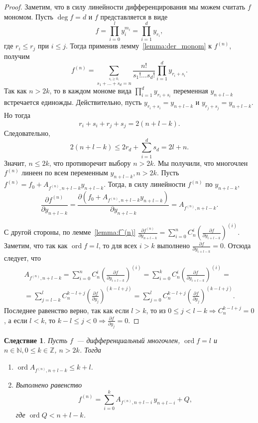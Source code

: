 \documentclass[16pt]{article}
\DeclareMathOperator{\ord}{ord}
\renewcommand{\le}{\leqslant} %
\renewcommand{\ge}{\geqslant} %
\theoremstyle{plain1}
\theoremstyle{plain2}
\theoremstyle{plain}
\theoremstyle{plain3}
\newtheorem{corollary}[theorem1]{Следствие}
\theoremstyle{definition}
\theoremstyle{remark}
\begin{document}
\begin{proof}
Заметим, что в силу линейности дифференцирования мы можем считать
$f$ мономом. Пусть $\deg f = d$ и $f$ представляется в
виде
$$
f=\prod\limits_{i=0}^ly_i^{m_i}=\prod\limits_{i=1}^{d}y_{r_i},
$$
где $r_i\le r_j$ при $i \le j$. Тогда применив лемму~\ref{lemma:der_monom} к $f^{(n)}$,
получим
$$
f^{(n)}=\sum\limits_{\stackrel{s_i\ge0,}{
s_1+\ldots+s_d=n}}\frac{n!}{s_1!\ldots s_d!}
\prod\limits_{i=1}^dy_{r_i+s_i}.
$$
Так как $n>2k$, то в каждом мономе вида $\prod_{i=1}^d y_{r_i+s_i}$
переменная $y_{n+l-k}$ встречается единожды. Действительно, пусть
$y_{r_i+s_i}=y_{n+l-k}$ и $y_{r_j+s_j}=y_{n+l-k}$. Но тогда
$$
r_i+s_i+r_j+s_j = 2(n+l-k).
$$
Следовательно,
$$
2(n+l-k)\le 2r_d + \sum_{i=1}^d s_d = 2l +n.
$$
Значит, $n \le 2k$, что противоречит выбору $n>2k$. Мы получили, что многочлен $f^{(n)}$ линеен по всем переменным $y_{n+l-k},n>2k $. Пусть $f^{(n)}=f_0+A_{f^{(n)},n+l-k}y_{n+l-k}$. Тогда, в силу линейности $f^{(n)}$ по $y_{n+l-k}$,
$$
\frac{\partial f^{(n)}}{\partial y_{n+l-k}}=\frac{\partial (f_0+A_{f^{(n)},n+l-k}y_{n+l-k})}{\partial y_{n+l-k}}=A_{f^{(n)},n+l-k}.
$$

С другой стороны, по лемме~\ref{lemma:f^(n)} $\frac{\partial f^{(n)}}{\partial y_{n+l-k}}= \sum\limits_{i=0}^n  C_n^i  \left(\frac{\partial f}{\partial y_{i+l-k}}\right)^{(i)} $. Заметим, что так как $\ord f = l$, то для всех $i>k$ выполнено $\frac{\partial f}{\partial y_{i+l-k}}=0$. Отсюда следует, что 
\begin{gather*}
A_{f^{(n)},n+l-k}=\sum\limits_{i=0}^n  C_n^i  \left(\frac{\partial f}{\partial y_{i+l-k}}\right)^{(i)}=\sum\limits_{i=0}^k  C_n^i  \left(\frac{\partial f}{\partial y_{i+l-k}}\right)^{(i)}=\\
=\sum\limits_{j=l-k}^l  C_n^{k-l+j}  \left(\frac{\partial f}{\partial y_{j}}\right)^{(k-l+j)}=\sum\limits_{j=0}^{l}C_n^{k - l + j
}\left(\frac{\partial f}{\partial y_j}\right)^{(k - l + j)}.
\end{gather*}
Последнее равенство верно, так как если $l>k$, то из $0 \le j<l-k \Longrightarrow C_n^{k-l+j}=0$, а если $l<k$, то  $k-l\le j<0 \Longrightarrow \frac{\partial f}{\partial y_{j}}=0$. 
\end{proof}

\begin{corollary}\label{corollary:deriv_equal}
Пусть $f$~--- дифференциальный многочлен, $\ord f = l$ и $n\in\mathbb{N},0\le k\in\mathbb{Z}$, $n>2k$.
Тогда
\begin{enumerate}
\item $\ord A_{f^{(n)},n+l-k}\le k+l$.

\item Выполнено равенство
$$
f^{(n)}=\sum\limits_{i=0}^{k} A_{f^{(n)},n+l -i} \, y_{n+l-i} + Q,
$$
где $\ord Q < n+l-k$.
\end{enumerate}
\end{corollary}
\end{document}
